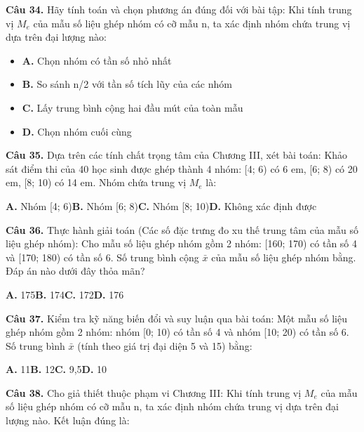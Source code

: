 \documentclass[11pt,a4paper]{article}
\begin{document}
\textbf{\color{primary} Câu 34.} Hãy tính toán và chọn phương án đúng đối với bài tập: Khi tính trung vị $M_e$ của mẫu số liệu ghép nhóm có cỡ mẫu n, ta xác định nhóm chứa trung vị dựa trên đại lượng nào:\par
\begin{itemize}\setlength{\itemsep}{1pt}\setlength{\parskip}{0pt}
  \item[] \textbf{A.} Chọn nhóm có tần số nhỏ nhất
  \item[] \textbf{B.} So sánh n/2 với tần số tích lũy của các nhóm
  \item[] \textbf{C.} Lấy trung bình cộng hai đầu mút của toàn mẫu
  \item[] \textbf{D.} Chọn nhóm cuối cùng
\end{itemize}\vspace{2pt}
\textbf{\color{primary} Câu 35.} Dựa trên các tính chất trọng tâm của Chương III, xét bài toán: Khảo sát điểm thi của 40 học sinh được ghép thành 4 nhóm: [4; 6) có 6 em, [6; 8) có 20 em, [8; 10) có 14 em. Nhóm chứa trung vị $M_e$ là:\par
\hspace*{1.5em}\textbf{A.} Nhóm [4; 6)\quad\quad \textbf{B.} Nhóm [6; 8)\quad\quad \textbf{C.} Nhóm [8; 10)\quad\quad \textbf{D.} Không xác định được\par\vspace{2pt}
\textbf{\color{primary} Câu 36.} Thực hành giải toán (Các số đặc trưng đo xu thế trung tâm của mẫu số liệu ghép nhóm): Cho mẫu số liệu ghép nhóm gồm 2 nhóm: [160; 170) có tần số 4 và [170; 180) có tần số 6. Số trung bình cộng $\bar{x}$ của mẫu số liệu ghép nhóm bằng. Đáp án nào dưới đây thỏa mãn?\par
\hspace*{1.5em}\textbf{A.} 175\quad\quad \textbf{B.} 174\quad\quad \textbf{C.} 172\quad\quad \textbf{D.} 176\par\vspace{2pt}
\textbf{\color{primary} Câu 37.} Kiểm tra kỹ năng biến đổi và suy luận qua bài toán: Một mẫu số liệu ghép nhóm gồm 2 nhóm: nhóm [0; 10) có tần số 4 và nhóm [10; 20) có tần số 6. Số trung bình $\bar{x}$ (tính theo giá trị đại diện 5 và 15) bằng:\par
\hspace*{1.5em}\textbf{A.} 11\quad\quad \textbf{B.} 12\quad\quad \textbf{C.} 9,5\quad\quad \textbf{D.} 10\par\vspace{2pt}
\textbf{\color{primary} Câu 38.} Cho giả thiết thuộc phạm vi Chương III: Khi tính trung vị $M_e$ của mẫu số liệu ghép nhóm có cỡ mẫu n, ta xác định nhóm chứa trung vị dựa trên đại lượng nào. Kết luận đúng là:\par
\end{document}
